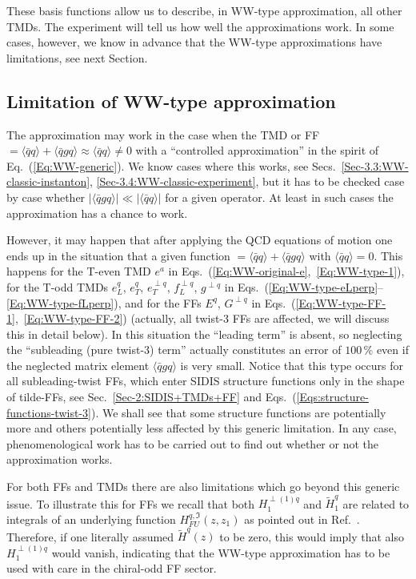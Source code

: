 \documentclass[a4paper,11pt]{article}
\newcommand{\la}{\langle}
\newcommand{\ra}{\rangle}
\begin{document}
These basis functions allow us to describe, in WW-type approximation,
all other TMDs. The experiment will tell us how well the approximations work.
In some cases, however, we know in advance that the WW-type approximations 
have limitations, see next Section.

\subsection{Limitation of WW-type approximation}
\label{Sec-3.8:limitations}

The approximation may work in the case when the TMD or FF 
$=\la\bar{q}q\ra + \la\bar{q}gq\ra \approx \la\bar{q}q\ra \neq 0$ with 
a ``controlled approximation'' in the spirit of Eq.~(\ref{Eq:WW-generic}).
We know cases where this works, see
Secs.~\ref{Sec-3.3:WW-classic-instanton}, \ref{Sec-3.4:WW-classic-experiment},
but it has to be checked case by case whether
$| \la\bar{q}gq\ra  | \ll  |\la\bar{q}q\ra|$ for a given operator.
At least in such cases the approximation has a chance to work.

However, it may happen that after applying the QCD equations
of motion one ends up in the situation that a given function 
$=\la\bar{q}q\ra + \la\bar{q}gq\ra$ with $\la\bar{q}q\ra = 0$.
This happens for the T-even TMD 
	$e^a$ in Eqs.~(\ref{Eq:WW-original-e},~\ref{Eq:WW-type-1}), 
for the T-odd TMDs 
	$e_L^q$, 
	$e_T^q$,
	$e_T^{\perp q}$, 
	$f_L^{\perp q}$,
	$g^{\perp q}$ in Eqs.~(\ref{Eq:WW-type-eLperp}--\ref{Eq:WW-type-fLperp}), 
and for the FFs
	$E^q$, 
	$G^{\perp q}$ in Eqs.~(\ref{Eq:WW-type-FF-1},~\ref{Eq:WW-type-FF-2})
(actually, all twist-3 FFs are affected, we will discuss this in detail below). 
In this situation the ``leading term'' is absent, so neglecting the 
``subleading (pure twist-3) term'' actually constitutes an error of $100\,\%$
even if the neglected matrix element  $\la\bar{q}gq\ra$ is very small.
Notice that this type occurs for all subleading-twist FFs, which enter 
SIDIS structure functions only in the shape of tilde-FFs, see 
Sec.~\ref{Sec-2:SIDIS+TMDs+FF} and 
Eqs.~(\ref{Eqs:structure-functions-twist-3}). 
We shall see that some structure functions are potentially more and 
others potentially less affected by this generic limitation. In any 
case, phenomenological work has to be carried out to find out whether 
or not the approximation works. 


For both FFs and TMDs there are also limitations 
which go beyond this generic issue. To illustrate this for FFs
we recall that both $H_1^{\perp(1)q}$ and $\tilde H_1^{q}$ are 
related to integrals of an underlying function $H_{FU}^{q,\Im}(z,z_1)$
as pointed out in Ref.~\cite{Kanazawa:2015ajw}. Therefore, if one 
literally assumed $\tilde H^q(z)$ to be zero, this would imply that 
also $H_1^{\perp(1)q}$ would vanish, indicating that the WW-type 
approximation has to be used with care in the chiral-odd FF sector.
\end{document}
